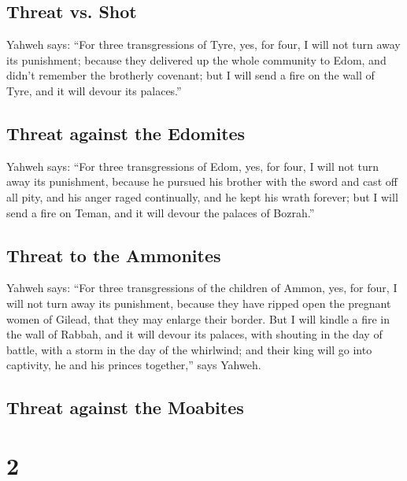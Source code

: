 \hypertarget{threat-vs.-shot}{%
\subsection{Threat vs. Shot}\label{threat-vs.-shot}}

 Yahweh says: ``For three transgressions of Tyre, yes, for
four, I will not turn away its punishment; because they delivered up the
whole community to Edom, and didn't remember the brotherly covenant;
 but I will send a fire on the wall of Tyre, and it will
devour its palaces.''

\hypertarget{threat-against-the-edomites}{%
\subsection{Threat against the
Edomites}\label{threat-against-the-edomites}}

 Yahweh says: ``For three transgressions of Edom, yes,
for four, I will not turn away its punishment, because he pursued his
brother with the sword and cast off all pity, and his anger raged
continually, and he kept his wrath forever;  but I will
send a fire on Teman, and it will devour the palaces of Bozrah.''

\hypertarget{threat-to-the-ammonites}{%
\subsection{Threat to the Ammonites}\label{threat-to-the-ammonites}}

 Yahweh says: ``For three transgressions of the children
of Ammon, yes, for four, I will not turn away its punishment, because
they have ripped open the pregnant women of Gilead, that they may
enlarge their border.  But I will kindle a fire in the
wall of Rabbah, and it will devour its palaces, with shouting in the day
of battle, with a storm in the day of the whirlwind;  and
their king will go into captivity, he and his princes together,'' says
Yahweh.

\hypertarget{threat-against-the-moabites}{%
\subsection{Threat against the
Moabites}\label{threat-against-the-moabites}}

\hypertarget{section-1}{%
\section{2}\label{section-1}}


